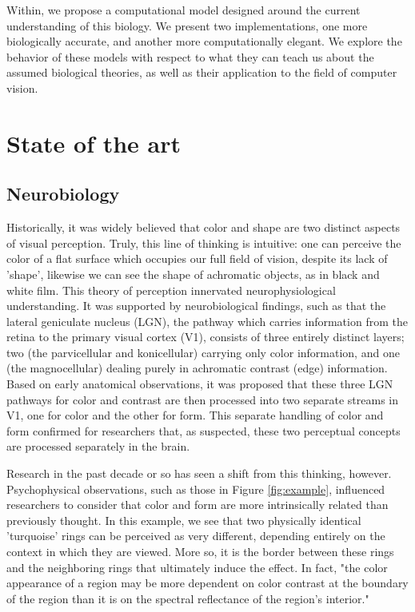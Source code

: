 \documentclass[journal,onecolumn]{IEEEtran}
\begin{document}
Within, we propose a computational model designed around the current understanding of this biology. We present two implementations, one more biologically accurate, and another more computationally elegant. We explore the behavior of these models with respect to what they can teach us about the assumed biological theories, as well as their application to the field of computer vision.


%
%
%
\section{State of the art}


\subsection{Neurobiology}

Historically, it was widely believed that color and shape are two distinct aspects of visual perception. Truly, this line of thinking is intuitive: one can perceive the color of a flat surface which occupies our full field of vision, despite its lack of 'shape', likewise we can see the shape of achromatic objects, as in black and white film. This theory of perception innervated neurophysiological understanding. It was supported by neurobiological findings, such as that the lateral geniculate nucleus (LGN), the pathway which carries information from the retina to the primary visual cortex (V1), consists of three entirely distinct layers; two (the parvicellular and konicellular) carrying only color information, and one (the magnocellular) dealing purely in achromatic contrast (edge) information. Based on early anatomical observations, it was proposed that these three LGN pathways for color and contrast are then processed into two separate streams in V1, one for color and the other for form. This separate handling of color and form confirmed for researchers that, as suspected, these two perceptual concepts are processed separately in the brain.

Research in the past decade or so has seen a shift from this thinking, however. Psychophysical observations, such as those in Figure \ref{fig:example}, influenced researchers to consider that color and form are more intrinsically related than previously thought. In this example, we see that two physically identical 'turquoise' rings can be perceived as very different, depending entirely on the context in which they are viewed. More so, it is the border between these rings and the neighboring rings that ultimately induce the effect. In fact, "the color appearance of a region may be more dependent on color contrast at the boundary of the region than it is on the spectral reflectance of the region's interior." \cite[p.572]{chalupa:vol2}
\end{document}
